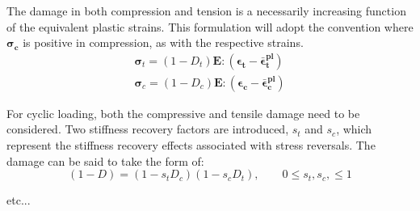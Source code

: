 The damage in both compression and tension is a necessarily increasing
function of the equivalent plastic strains. This formulation will
adopt the convention where $\boldsymbol{\mathbf{\sigma}_{c}}$ is
positive in compression, as with the respective strains. 
\begin{equation}
\begin{array}{c}
\boldsymbol{\sigma}_{t}=(1-D_{t})\mathbf{E}:(\boldsymbol{\epsilon_{t}}-\boldsymbol{\bar{\epsilon}_{t}^{pl}})\\
\boldsymbol{\sigma}_{c}=(1-D_{c})\mathbf{E}:(\boldsymbol{\epsilon_{c}}-\boldsymbol{\bar{\epsilon}_{c}^{pl}})
\end{array}
\label{eqn:dam3}
\end{equation}

For cyclic loading, both the compressive and tensile damage need to
be considered. Two stiffness recovery factors are introduced, $s_{t}$
and $s_{c}$, which represent the stiffness recovery effects associated
with stress reversals. The damage can be said to take the form of:
\begin{equation}
(1-D)=(1-s_{t}D_{c})(1-s_{c}D_{t}),\qquad0\leq s_{t},s_{c},\leq1\label{eqn:dam4}
\end{equation}

etc...
